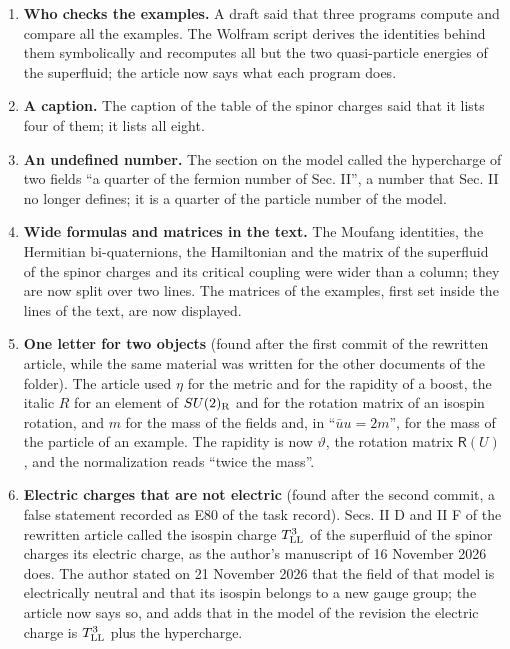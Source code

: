 \documentclass[
  10pt,
]{article}
\begin{document}
\begin{enumerate}
  in it.
\item
  \textbf{Who checks the examples.} A draft said that three programs
  compute and compare all the examples. The Wolfram script derives the
  identities behind them symbolically and recomputes all but the two
  quasi-particle energies of the superfluid; the article now says what
  each program does.
\item
  \textbf{A caption.} The caption of the table of the spinor charges
  said that it lists four of them; it lists all eight.
\item
  \textbf{An undefined number.} The section on the model called the
  hypercharge of two fields ``a quarter of the fermion number of Sec.
  II'', a number that Sec. II no longer defines; it is a quarter of the
  particle number of the model.
\item
  \textbf{Wide formulas and matrices in the text.} The Moufang
  identities, the Hermitian bi-quaternions, the Hamiltonian and the
  matrix of the superfluid of the spinor charges and its critical
  coupling were wider than a column; they are now split over two lines.
  The matrices of the examples, first set inside the lines of the text,
  are now displayed.
\item
  \textbf{One letter for two objects} (found after the first commit of
  the rewritten article, while the same material was written for the
  other documents of the folder). The article used \(\eta\) for the
  metric and for the rapidity of a boost, the italic \(R\) for an
  element of \(SU(2)_{\rm R}\) and for the rotation matrix of an isospin
  rotation, and \(m\) for the mass of the fields and, in
  ``\(\bar uu=2m\)'', for the mass of the particle of an example. The
  rapidity is now \(\vartheta\), the rotation matrix \(\mathsf R(U)\),
  and the normalization reads ``twice the mass''.
\item
  \textbf{Electric charges that are not electric} (found after the
  second commit, a false statement recorded as E80 of the task record).
  Secs. II D and II F of the rewritten article called the isospin charge
  \(T^3_{\rm LL}\) of the superfluid of the spinor charges its electric
  charge, as the author's manuscript of 16 November 2026 does. The
  author stated on 21 November 2026 that the field of that model is
  electrically neutral and that its isospin belongs to a new gauge
  group; the article now says so, and adds that in the model of the
  revision the electric charge is \(T^3_{\rm LL}\) plus the hypercharge.
\end{enumerate}
\end{document}
